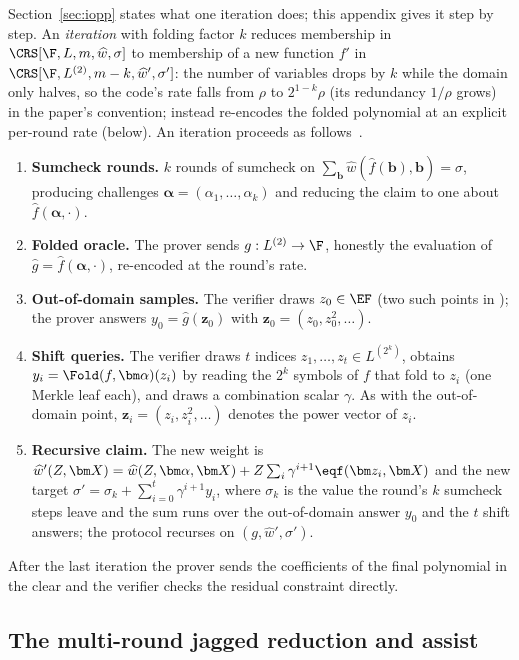 Section~\ref{sec:iopp} states what one iteration does; this appendix gives it step by step. An \emph{iteration} with folding factor $k$ reduces membership in $\CRS[\F, L, m, \widehat w, \sigma]$ to membership of a new function $f'$ in $\CRS[\F, L^{(2)}, m - k, \widehat w', \sigma']$: the number of variables drops by $k$ while the domain only halves, so the code's rate falls from $\rho$ to $2^{1-k}\rho$ (its redundancy $1/\rho$ grows) in the paper's convention; \Zirenver{} instead re-encodes the folded polynomial at an explicit per-round rate (below). An iteration proceeds as follows~\citep[\S2.1.3]{whir}.
\begin{enumerate}
  \item \textbf{Sumcheck rounds.} $k$ rounds of sumcheck on $\sum_{\bm b} \widehat w(\widehat f(\bm b), \bm b) = \sigma$, producing challenges $\bm\alpha = (\alpha_1, \dots, \alpha_k)$ and reducing the claim to one about $\widehat f(\bm\alpha, \cdot)$.
  \item \textbf{Folded oracle.} The prover sends $g : L^{(2)} \to \F$, honestly the evaluation of $\widehat g = \widehat f(\bm\alpha, \cdot)$, re-encoded at the round's rate.
  \item \textbf{Out-of-domain samples.} The verifier draws $z_0 \in \EF$ (two such points in \Zirenver{}); the prover answers $y_0 = \widehat g(\bm z_0)$ with $\bm z_0 = (z_0, z_0^2, \dots)$.
  \item \textbf{Shift queries.} The verifier draws $t$ indices $z_1, \dots, z_t \in L^{(2^k)}$, obtains $y_i = \Fold(f, \bm\alpha)(z_i)$ by reading the $2^k$ symbols of $f$ that fold to $z_i$ (one Merkle leaf each), and draws a combination scalar $\gamma$. As with the out-of-domain point, $\bm z_i = (z_i, z_i^2, \dots)$ denotes the power vector of $z_i$.
  \item \textbf{Recursive claim.} The new weight is $\widehat w'(Z, \bm X) = \widehat w(Z, \bm\alpha, \bm X) + Z \sum_i \gamma^{i+1} \eqf(\bm z_i, \bm X)$ and the new target $\sigma' = \sigma_k + \sum_{i=0}^{t} \gamma^{i+1} y_i$, where $\sigma_k$ is the value the round's $k$ sumcheck steps leave and the sum runs over the out-of-domain answer $y_0$ and the $t$ shift answers; the protocol recurses on $(g, \widehat w', \sigma')$.
\end{enumerate}
After the last iteration the prover sends the coefficients of the final polynomial in the clear and the verifier checks the residual constraint directly.

\subsection{The multi-round jagged reduction and assist}
\label{sec:app-jagged}

